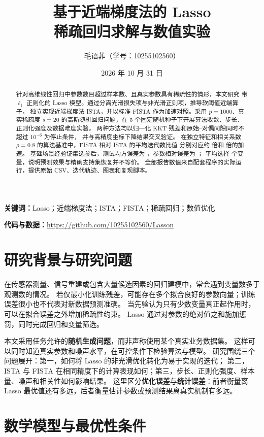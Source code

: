 \documentclass[UTF8,11pt,a4paper,fontset=fandol]{ctexart}
\title{\vspace{-1.5em}\textbf{基于近端梯度法的 Lasso\\稀疏回归求解与数值实验}}
\author{毛语菲（学号：10255102560）}
\date{2026 年 10 月 31 日}
\begin{document}
\maketitle
\thispagestyle{fancy}
\begin{abstract}
针对高维线性回归中参数数目超过样本数、且真实参数具有稀疏性的情形，本文研究
带 $\ell_1$ 正则化的 Lasso 模型。通过分离光滑损失项与非光滑正则项，推导软阈值近端算子，
独立实现近端梯度法 ISTA，并以标准 FISTA 作为加速对照。采用 $p=1000$、真实稀疏度 $s=20$
的高斯随机回归问题，在 5 个固定随机种子下开展算法收敛、步长、正则化强度及数据难度实验。
两种方法均以归一化 KKT 残差和原始--对偶间隙同时不超过 $10^{-6}$ 为停止条件，
并与高精度坐标下降结果交叉验证。
在独立特征和相关系数 $\rho=0.8$ 的算法基准中，FISTA 相对 ISTA 的平均迭代数比值
分别对应约 \IterSpeedIndependent{} 倍和 \IterSpeedCorrelated{} 倍的加速。
基础场景经验证集选参后，测试均方误差为 \BaseMSE{}，参数相对误差为 \BaseError{}；
平均选择 \BaseNNZ{} 个变量，说明预测效果与精确支持集恢复并不等价。
全部报告数值来自配套程序的实际运行，提供原始 CSV、迭代轨迹、图表和复现脚本。
\end{abstract}
\noindent\textbf{关键词：}Lasso；近端梯度法；ISTA；FISTA；稀疏回归；数值优化
\par\noindent\textbf{代码与数据：}\url{https://github.com/10255102560/Lasson}

\section{研究背景与研究问题}
在传感器测量、信号重建或包含大量候选因素的回归建模中，常会遇到变量数多于观测数的情况。
若仅最小化训练残差，可能存在多个拟合良好的参数向量；训练误差很小也不代表对新数据预测准确。
当先验认为只有少数变量真正起作用时，可以在拟合误差之外增加稀疏性约束。
Lasso 通过对参数的绝对值之和施加惩罚，同时完成回归和变量筛选\cite{tibshirani}。

本文采用任务允许的\textbf{随机生成问题}，而非声称使用某个真实业务数据集。
这样可以同时知道真实参数和噪声水平，在可控条件下检验算法与模型。
研究围绕三个问题展开：第一，如何将 Lasso 的非光滑优化转化为易于实现的迭代；
第二，ISTA 与 FISTA 在相同精度下的计算表现如何；第三，步长、正则化强度、样本量、噪声和相关性如何影响结果。
这里区分\textbf{优化误差}与\textbf{统计误差}：前者衡量离 Lasso 最优值还有多远，后者衡量估计参数或预测结果离真实机制有多远。

\section{数学模型与最优性条件}
\end{document}

